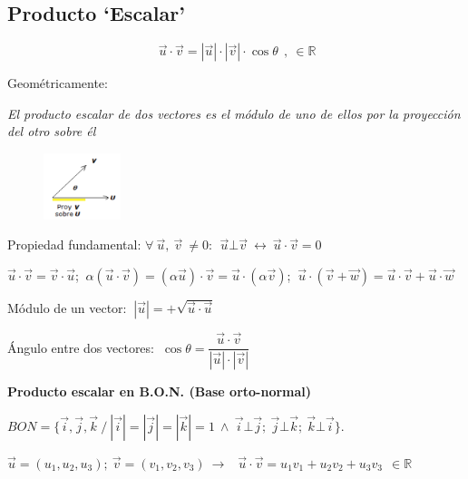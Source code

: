 \subsection{Producto `Escalar'}

\begin{equation}
	\boxed{\ \vec u \cdot \vec v = |\vec u| \cdot |\vec v| \cdot \cos \theta \ } \ ,\ \in \mathbb{R} 
\end{equation}			

\vspace{3mm}

\begin{multicols}{2}
Geométricamente:

\emph{El producto escalar de dos vectores es el módulo de uno de ellos por la proyección del otro sobre él}
\begin{figure}[H]
	\centering
	\includegraphics[width=0.2\textwidth]{imagenes/imagenescv/T10IM07.png}
\end{figure}
\end{multicols}


	Propiedad fundamental: $\forall \  \vec u,\ \vec v\ \neq 0:\ \boxed{\  \vec u \bot \vec v \ \leftrightarrow \ \vec u \cdot \vec v=0 \ }$
		
	$\vec u \cdot \vec v = \vec v \cdot \vec u$; $\ \alpha ( \vec u \cdot \vec v) =( \alpha \vec u) \cdot \vec v = \vec u \cdot ( \alpha \vec v)$; $\ \vec u \cdot (\vec v + \vec w)= \vec u \cdot \vec v + \vec u \cdot \vec w$
		
	 Módulo de un vector: $\boxed{ \ | \vec u |=+\sqrt{\vec u \cdot \vec u} \ }$
		
	 Ángulo entre dos vectores: $\boxed{ \ \cos \theta = \dfrac {\vec u \cdot \vec v}{|\vec u| \cdot |\vec v|} \ }$
	 
\vspace{4mm} \textbf{Producto escalar en B.O.N. \small{(Base orto-normal)}}

$BON=\{ \vec i, \vec j, \vec k \ / \  |\vec i|=|\vec j|=|\vec k|=1 \ \wedge \ \vec i \bot \vec j; \ \vec j \bot \vec k; \ \vec k \bot \vec i \}$. 

$\vec u=(u_1,u_2,u_3); \ \vec v=(v_1, v_2, v_3) \ \to \ $
$\boxed{  \ \vec u \cdot \vec v= u_1 v_1+u_2 v_2+u_3 v_3 \ }  \  \in \mathbb{R}$

